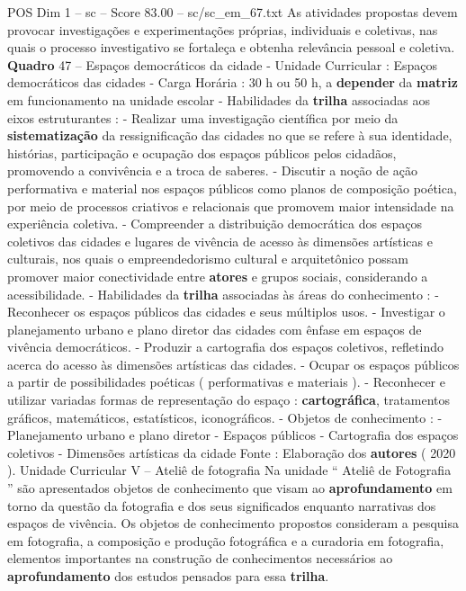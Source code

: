 \begin{textsample}{POS Dim 1 – sc – Score 83.00 – sc/sc\_em\_67.txt}
As atividades propostas devem provocar investigações e experimentações próprias, individuais e coletivas, nas quais o processo investigativo se fortaleça e obtenha relevância pessoal e coletiva. \textbf{Quadro} 47 – Espaços democráticos da cidade - Unidade Curricular : Espaços democráticos das cidades - Carga Horária : 30 h ou 50 h, a \textbf{depender} da \textbf{matriz} em funcionamento na unidade escolar - Habilidades da \textbf{trilha} associadas aos eixos estruturantes : - Realizar uma investigação científica por meio da \textbf{sistematização} da ressignificação das cidades no que se refere à sua identidade, histórias, participação e ocupação dos espaços públicos pelos cidadãos, promovendo a convivência e a troca de saberes. - Discutir a noção de ação performativa e material nos espaços públicos como planos de composição poética, por meio de processos criativos e relacionais que promovem maior intensidade na experiência coletiva. - Compreender a distribuição democrática dos espaços coletivos das cidades e lugares de vivência de acesso às dimensões artísticas e culturais, nos quais o empreendedorismo cultural e arquitetônico possam promover maior conectividade entre \textbf{atores} e grupos sociais, considerando a acessibilidade. - Habilidades da \textbf{trilha} associadas às áreas do conhecimento : - Reconhecer os espaços públicos das cidades e seus múltiplos usos. - Investigar o planejamento urbano e plano diretor das cidades com ênfase em espaços de vivência democráticos. - Produzir a cartografia dos espaços coletivos, refletindo acerca do acesso às dimensões artísticas das cidades. - Ocupar os espaços públicos a partir de possibilidades poéticas ( performativas e materiais ). - Reconhecer e utilizar variadas formas de representação do espaço : \textbf{cartográfica}, tratamentos gráficos, matemáticos, estatísticos, iconográficos. - Objetos de conhecimento : - Planejamento urbano e plano diretor - Espaços públicos - Cartografia dos espaços coletivos - Dimensões artísticas da cidade Fonte : Elaboração dos \textbf{autores} ( 2020 ).
Unidade Curricular V – Ateliê de fotografia Na unidade “ Ateliê de Fotografia ” são apresentados objetos de conhecimento que visam ao \textbf{aprofundamento} em torno da questão da fotografia e dos seus significados enquanto narrativas dos espaços de vivência.
Os objetos de conhecimento propostos consideram a pesquisa em fotografia, a composição e produção fotográfica e a curadoria em fotografia, elementos importantes na construção de conhecimentos necessários ao \textbf{aprofundamento} dos estudos pensados para essa \textbf{trilha}.

\end{textsample}
